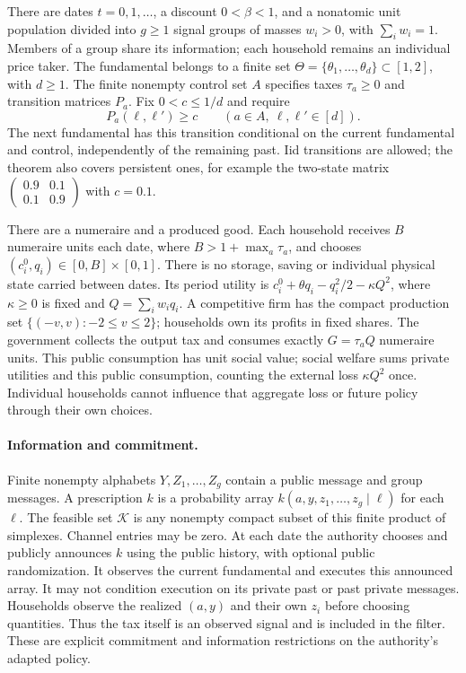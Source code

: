 \documentclass[11pt,a4paper]{article}
\newcommand{\cK}{\mathcal K}
\begin{document}
There are dates $t=0,1,\ldots$, a discount $0<\beta<1$, and a nonatomic unit
population divided into $g\geq1$ signal groups of masses $w_i>0$, with
$\sum_iw_i=1$. Members of a group share its information; each household remains
an individual price taker. The fundamental belongs to a finite set
$\Theta=\{\theta_1,\ldots,\theta_d\}\subset[1,2]$, with $d\geq1$.
The finite nonempty control set $A$ specifies taxes $\tau_a\geq0$ and transition
matrices $P_a$. Fix $0<c\leq1/d$ and require
\[
 P_a(\ell,\ell')\geq c\qquad(a\in A,\ \ell,\ell'\in[d]).
\]
The next fundamental has this transition conditional on the current fundamental
and control, independently of the remaining past. Iid transitions are allowed;
the theorem also covers persistent ones, for example the two-state matrix
$\left(\begin{smallmatrix}0.9&0.1\\0.1&0.9\end{smallmatrix}\right)$ with $c=0.1$.

There are a numeraire and a produced good. Each household receives $B$ numeraire
units each date, where $B>1+\max_a\tau_a$, and chooses
$(c_i^0,q_i)\in[0,B]\times[0,1]$. There is no storage, saving or individual
physical state carried between dates. Its period utility is
$c_i^0+\theta q_i-q_i^2/2-\kappa Q^2$, where $\kappa\geq0$ is fixed and
$Q=\sum_iw_iq_i$. A competitive firm has the compact production set
$\{(-v,v):-2\leq v\leq2\}$; households own its profits in fixed shares.
The government collects the output tax and consumes exactly
$G=\tau_aQ$ numeraire units. This public consumption has unit social value;
social welfare sums private utilities and this public consumption, counting
the external loss $\kappa Q^2$ once. Individual households cannot influence that
aggregate loss or future policy through their own choices.

\paragraph{Information and commitment.}
Finite nonempty alphabets $Y,Z_1,\ldots,Z_g$ contain a public message and group
messages. A prescription $k$ is a probability array
$k(a,y,z_1,\ldots,z_g\mid\ell)$ for each $\ell$.
The feasible set $\cK$ is any nonempty compact subset of this finite product of
simplexes. Channel entries may be zero. At each date the authority chooses and
publicly announces $k$ using the public history, with optional public
randomization. It observes the current fundamental and executes this announced
array. It may not condition execution on its private past or past private
messages. Households observe the realized $(a,y)$ and their own $z_i$ before
choosing quantities. Thus the tax itself is an observed signal and is included
in the filter. These are explicit commitment and information restrictions on
the authority's adapted policy.
\end{document}
